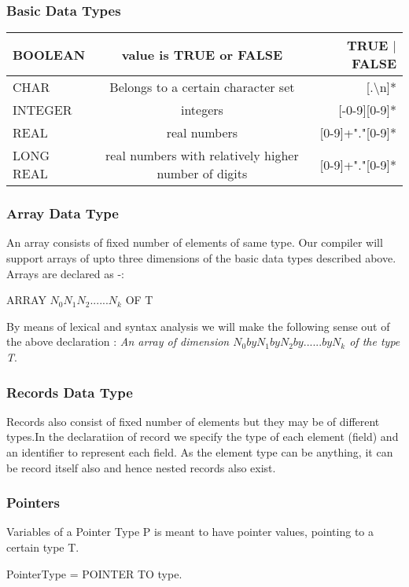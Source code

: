 \documentclass{article}
\begin{document}
\subsubsection {Basic Data Types}

\begin{center}
  \begin{tabular}{| l | c | r | }
    \hline
    BOOLEAN & value is TRUE or FALSE & TRUE ${|}$ FALSE \\ \hline
    CHAR & Belongs to a certain character set & [.\textbackslash n]* \\ \hline
    INTEGER & integers & [-0-9][0-9]* \\ \hline
   REAL & real numbers & [0-9]+"."[0-9]*\\  \hline
  LONG REAL & real numbers with relatively higher number of digits& [0-9]+"."[0-9]*\\ 
    \hline
  \end{tabular}
\end{center}

\subsubsection{Array Data Type}
An array consists of fixed number of elements of same type. Our compiler will support arrays of upto three dimensions of the basic data types described above. Arrays are declared as -:
\begin{center}
{ARRAY $N_{0} N_{1} N_{2} ...... N_{k}$ OF T}
\end{center}
By means of lexical and syntax analysis we will make the following sense out of the above declaration : {\it An array of dimension $N_{0} by N_{1} by N_{2} by ...... by N_{k}$ of the type T}.

\subsubsection{Records Data Type}
Records also consist of fixed number of elements but they may be of different types.In the declaratiion of record we specify the type of each element (field) and an identifier to represent each field. As the element type can be anything, it can be record itself also and hence nested records also exist.

\subsubsection{Pointers}
Variables of a Pointer Type P is meant to have pointer values, pointing to a certain type T.
\begin{center}
PointerType = POINTER TO type.
\end{center}
\end{document}
